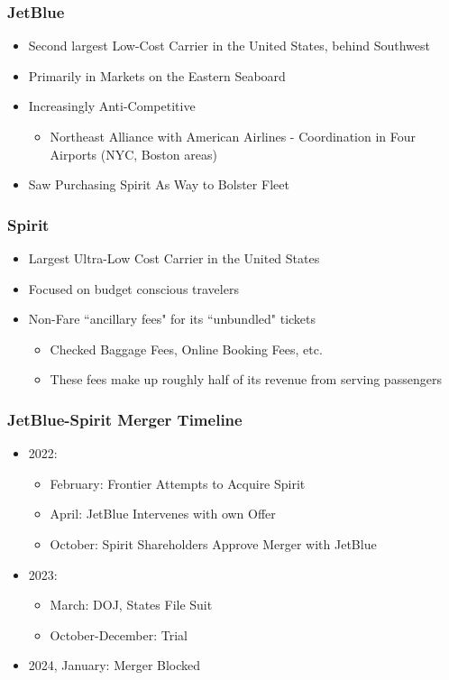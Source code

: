 \documentclass[xcolor=dvipsnames]{beamer}
\begin{document}
    \begin{frame}
        \frametitle{JetBlue}
        \begin{itemize}
            \item Second largest Low-Cost Carrier in the United States, behind Southwest
            \item Primarily in Markets on the Eastern Seaboard
            \item Increasingly Anti-Competitive
            \begin{itemize}
                \item Northeast Alliance with American Airlines - Coordination in Four Airports (NYC, Boston areas)
            \end{itemize}
            \item Saw Purchasing Spirit As Way to Bolster Fleet
        \end{itemize}
    \end{frame}

    \begin{frame}
        \frametitle{Spirit}
        \begin{itemize}
            \item Largest Ultra-Low Cost Carrier in the United States
            \item Focused on budget conscious travelers
            \item Non-Fare ``ancillary fees" for its ``unbundled" tickets
            \begin{itemize}
                \item Checked Baggage Fees, Online Booking Fees, etc.
                \item These fees make up roughly half of its revenue from serving passengers 
            \end{itemize}
        \end{itemize}
    \end{frame}


    \begin{frame}
        \frametitle{JetBlue-Spirit Merger Timeline}
        \begin{itemize}
        \item 2022:
        \begin{itemize}
            \item February: Frontier Attempts to Acquire Spirit
            \item April: JetBlue Intervenes with own Offer
            \item October: Spirit Shareholders Approve Merger with JetBlue
        \end{itemize}
        \item 2023: 
        \begin{itemize}
            \item March: DOJ, States File Suit
            \item October-December: Trial
        \end{itemize}
        \item 2024, January: Merger Blocked
        \end{itemize}
    \end{frame}
\end{document}
